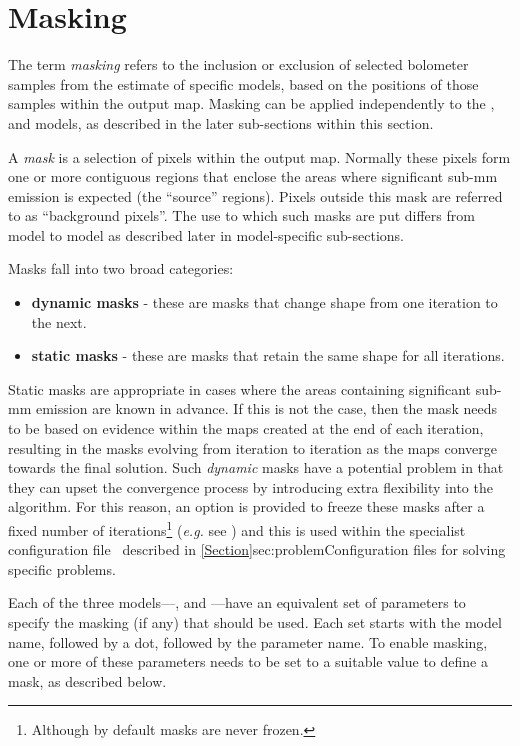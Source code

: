 \section{Masking}
\label{sec:masking}

The term \emph{masking} refers to the inclusion or exclusion of selected
bolometer samples from the estimate of specific models, based on the
positions of those samples within the output map. Masking can be applied
independently to the ,  and  models, as
described in the later sub-sections within this section.

A \emph{mask} is a selection of pixels within the output map. Normally
these pixels form one or more contiguous regions that enclose the areas
where significant sub-mm emission is expected (the ``source'' regions).
Pixels outside this mask are referred to as ``background pixels''. The use
to which such masks are put differs from model to model as described
later in model-specific sub-sections.

Masks fall into two broad categories:
\begin{itemize}

\item \textbf{dynamic masks} - these are masks that change shape from one
iteration to the next.

\item \textbf{static masks} - these are masks that retain the same shape
for all iterations.

\end{itemize}

Static masks are appropriate in cases where the areas containing significant
sub-mm emission are known in advance. If this is not the case, then the
mask needs to be based on evidence within the maps created at the end of
each iteration, resulting in the masks evolving from iteration to iteration
as the maps converge towards the final solution. Such \emph{dynamic} masks
have a potential problem  in that they can upset the convergence process by
introducing extra flexibility into the algorithm. For this reason, an
option is provided to freeze these masks after a fixed number of
iterations\footnote{Although by default masks are never frozen.}
(\emph{e.g.} see ) and this
is used within the specialist configuration file \fixconvergence\
described in \cref{Section}{sec:problem}{Configuration files for solving
specific problems}.

Each of the three models---,  and 
---have an equivalent set of parameters to specify the masking (if any)
that should be used. Each set starts with the model name, followed by a
dot, followed by the parameter name. To enable masking, one or more of
these parameters needs to be set to a suitable value to define a mask, as
described below.

